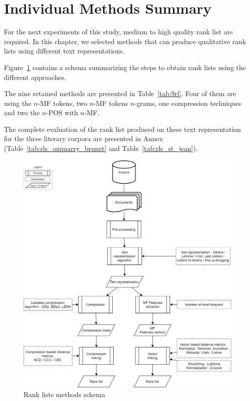 \section{Individual Methods Summary \label{sec:individual_methods_summary}}

For the next experiments of this study, medium to high quality rank list are required.
In this chapter, we selected methods that can produce qualitative rank lists using different text representations.

Figure~\ref{fig:schema-rank_lists} contains a schema summarizing the steps to obtain rank lists using the different approaches.

The nine retained methods are presented in Table~\ref{tab:9rl}.
Four of them are using the $n$-MF tokens, two $n$-MF tokens $n$-grams, one compression techniques and two the $n$-POS with $n$-MF.

The complete evaluation of the rank list produced on these text representation for the three literary corpora are presented in Annex (Table~\ref{tab:rls_oxquarry_brunet} and Table~\ref{tab:rls_st_jean}).

\begin{figure}[!t]
  \centering
  \caption{Rank lists methods schema}
  \label{fig:schema-rank_lists}
  \includegraphics[width=0.90\linewidth]{img/schema-rank_lists.png}
\end{figure}

